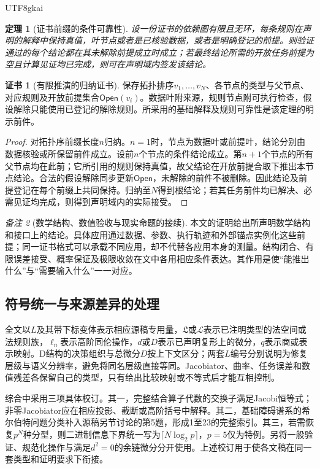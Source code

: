 \documentclass[11pt,a4paper]{article}
\theoremstyle{plain}
\newtheorem{theorem}{定理}[section]
\theoremstyle{definition}
\newtheorem*{certificate}{证书}
\theoremstyle{remark}
\newtheorem{remark}[theorem]{备注}
\begin{document}
\begin{CJK*}{UTF8}{gkai}
\begin{theorem}[证书前缀的条件可靠性]
\label{thm:certificate-soundness}
设一份证书的依赖图有限且无环，每条规则在声明的解释中保持真值，叶节点或者是已核验数据，或者是明确登记的前提。则验证通过的每个结论都在其未解除前提成立时成立；若最终结论所需的开放任务前提为空且计算见证均已完成，则可在声明域内签发该结论。
\end{theorem}
\begin{certificate}[有限推演的归纳证书]
保存拓扑排序$v_1,\ldots,v_N$、各节点的类型与父节点、对应规则及开放前提集合$\mathsf{Open}(v_i)$。数据叶附来源，规则节点附可执行检查，假设解除只能使用已登记的解除规则。所采用的基础解释及规则可靠性是该定理的明示前件。
\end{certificate}
\begin{proof}
对拓扑序前缀长度$n$归纳。$n=1$时，节点为数据叶或前提叶，结论分别由数据核验或所保留前件成立。设前$n$个节点的条件结论成立。第$n+1$个节点的所有父节点均在此前；它所引用的规则保持真值，故父结论在开放前提合取下推出本节点结论。合法的假设解除同步更新$\mathsf{Open}$，未解除的前件不被删除。因此结论及前提登记在每个前缀上共同保持。归纳至$N$得到根结论；若其任务前件均已解决、必需见证均完成，则得到声明域内的实际接受。
\end{proof}

\begin{remark}[数学结构、数值验收与现实命题的接续]
本文的证明给出所声明数学结构和接口上的结论。具体应用通过数据、参数、执行轨迹和外部锚点实例化这些前提；同一证书格式可以承载不同应用，却不代替各应用本身的测量。结构闭合、有限误差接受、概率保证及极限收敛在文中各用相应条件表达。其作用是使“能推出什么”与“需要输入什么”一一对应。
\end{remark}

\subsection{符号统一与来源差异的处理}
全文以$L$及其带下标变体表示相应源稿专用量，$\mathfrak L$或$\mathcal L$表示已注明类型的法空间或法规则族，$\ell_n$表示高阶同伦操作，$d$或$D$表示已声明复形上的微分，$q$表示商或表示映射。D结构的决策组织与总微分$D$按上下文区分；两套$L$编号分别说明为修复层级与语义分辨率，避免将同名层级直接等同。Jacobiator、曲率、任务误差和数值残差各保留自己的类型，只有给出比较映射或不等式后才能互相控制。

综合中采用三项具体校订。其一，完整结合算子代数的交换子满足Jacobi恒等式；非零Jacobiator应在相应投影、截断或高阶括号中解释。其二，基础障碍谱系的希尔伯特问题分类补入源稿另节讨论的第5题，形成1至23的完整索引。其三，若需恢复$p^N$种分型，则二进制信息下界统一写为$\lceil N\log_2p\rceil$，$p=5$仅为特例。另将一般验证、规范化操作与满足$d^2=0$的余链微分分开使用。上述校订用于使各文稿在同一套类型和证明要求下衔接\cite{S01,S27,S37,S38}。



\end{CJK*}
\end{document}
